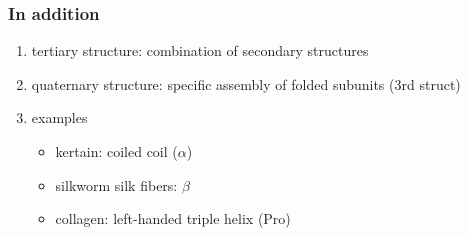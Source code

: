 \subsubsection{In addition}

\begin{enumerate}
	\def\labelenumi{\arabic{enumi}.}
	\item
	tertiary structure: combination of secondary structures
	\item
	quaternary structure: specific assembly of folded subunits (3rd
	struct)
	\item
	examples
	
	\begin{itemize}
		\item
		kertain: coiled coil (\(\alpha\))
		\item
		silkworm silk fibers: \(\beta\)
		\item
		collagen: left-handed triple helix (Pro)
	\end{itemize}
\end{enumerate}
